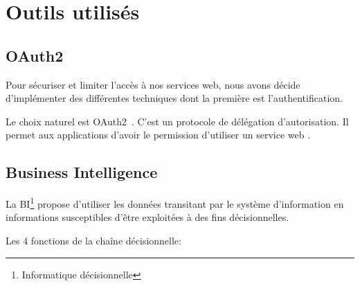 \section{Outils utilisés}

\subsection{OAuth2}

Pour sécuriser et limiter l'accès à nos services web, nous avons décide d'implémenter des différentes techniques dont la première est l'authentification.

Le choix naturel est OAuth2~\cite{RFC6749}. C'est un protocole de délégation
d'autorisation. Il permet aux applications  d'avoir
le permission d'utiliser un service web .



\subsection{Business Intelligence}

La \acrfull{BI}\footnote{Informatique décisionnelle} propose d'utiliser les
données transitant par le système d'information en informations susceptibles
d'être exploitées à des fins décisionnelles.


Les 4 fonctions de la chaîne décisionnelle:


